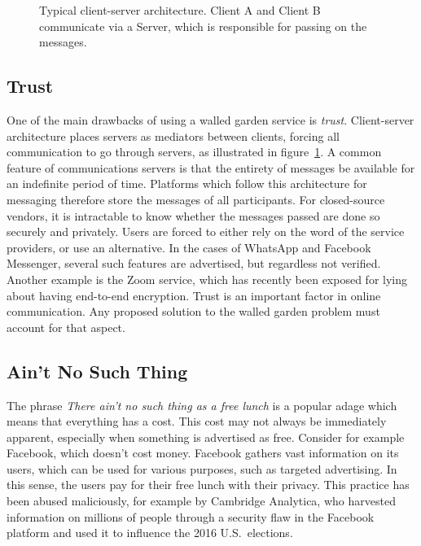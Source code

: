 \begin{figure}
	\centering
	\resizebox{!}{!}{}
	\caption{
		Typical client-server architecture.
		Client A and Client B communicate via a Server, which is responsible for passing on the messages.
	}\label{fig:client_server}
\end{figure}

\subsection{Trust}\label{sec:Trust}
One of the main drawbacks of using a walled garden service is \textit{trust}.
Client-server architecture places servers as mediators between clients, forcing all communication to go through servers, as illustrated in figure~\ref{fig:client_server}.
A common feature of communications servers is that the entirety of messages be available for an indefinite period of time.
Platforms which follow this architecture for messaging therefore store the messages of all participants.
For closed-source vendors, it is intractable to know whether the messages passed are done so securely and privately.
Users are forced to either rely on the word of the service providers, or use an alternative.
In the cases of WhatsApp and Facebook Messenger, several such features are advertised, but regardless not verified\cite{twitter_comms_protocol_comparison}.
Another example is the Zoom service, which has recently been exposed for lying about having end-to-end encryption\cite{zoom_e2ee_or_not}.
Trust is an important factor in online communication.
Any proposed solution to the walled garden problem must account for that aspect.

\subsection{Ain't No Such Thing}
The phrase \textit{There ain't no such thing as a free lunch} is a popular adage which means that everything has a cost.
This cost may not always be immediately apparent, especially when something is advertised as free.
Consider for example Facebook, which doesn't cost money.
Facebook gathers vast information on its users, which can be used for various purposes, such as targeted advertising.
In this sense, the users pay for their free lunch with their privacy.
This practice has been abused maliciously, for example by Cambridge Analytica,
who harvested information on millions of people through a security flaw in the Facebook platform and used it to influence the 2016 U.S.~elections\cite{cadwalladr2018revealed, cadwalladr2018cambridge, isaak2018user, berghel2018malice}.


